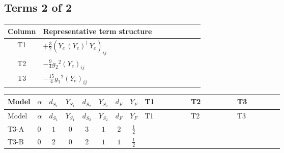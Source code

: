 \documentclass[8pt]{article}
\begin{document}
\begin{landscape}
\subsection*{Terms 2 of 2}
\begin{center}
\begin{tabular}{@{}c >{\raggedright\arraybackslash}p{0.82\linewidth}@{}}
\toprule
Column & Representative term structure \\
\midrule
T1 & \(\displaystyle +\frac{3}{2} \left({Y_e}\,\left({Y_e}\right)^{\dagger}\,{Y_e}\right)_{ij}\) \\
\midrule
T2 & \(\displaystyle -\frac{9}{4} {g_2}^2 \left({Y_e}\right)_{ij}\) \\
\midrule
T3 & \(\displaystyle -\frac{15}{4} {g_1}^2 \left({Y_e}\right)_{ij}\) \\
\midrule
\bottomrule
\end{tabular}
\end{center}
\smallskip
\tiny
\begin{longtable}{@{}llcccccc >{\raggedright\arraybackslash}p{0.21\linewidth} >{\raggedright\arraybackslash}p{0.21\linewidth} >{\raggedright\arraybackslash}p{0.21\linewidth}@{}}
\toprule
Model & $\alpha$ & $d_{S_1}$ & $Y_{S_1}$ & $d_{S_2}$ & $Y_{S_2}$ & $d_F$ & $Y_F$ & T1 & T2 & T3 \\
\midrule
\endfirsthead
\toprule
Model & $\alpha$ & $d_{S_1}$ & $Y_{S_1}$ & $d_{S_2}$ & $Y_{S_2}$ & $d_F$ & $Y_F$ & T1 & T2 & T3 \\
\midrule
\endhead
T3-A & $0$ & $1$ & $0$ & $3$ & $1$ & $2$ & $\frac{1}{2}$ & \scriptsize\adjustbox{max width=\linewidth}{$\begin{gathered} +\frac{3}{2} \left({Y_e}\,\left({Y_e}\right)^{\dagger}\,{Y_e}\right)_{ij}\end{gathered}$} & \scriptsize\adjustbox{max width=\linewidth}{$\begin{gathered} -\frac{9}{4} {g_2}^2 \left({Y_e}\right)_{ij}\end{gathered}$} & \scriptsize\adjustbox{max width=\linewidth}{$\begin{gathered} -\frac{15}{4} {g_1}^2 \left({Y_e}\right)_{ij}\end{gathered}$} \\
\midrule
T3-B & $0$ & $2$ & $0$ & $2$ & $1$ & $1$ & $\frac{1}{2}$ & \scriptsize\adjustbox{max width=\linewidth}{$\begin{gathered} +\frac{3}{2} \left({Y_e}\,\left({Y_e}\right)^{\dagger}\,{Y_e}\right)_{ij}\end{gathered}$} & \scriptsize\adjustbox{max width=\linewidth}{$\begin{gathered} -\frac{9}{4} {g_2}^2 \left({Y_e}\right)_{ij}\end{gathered}$} & \scriptsize\adjustbox{max width=\linewidth}{$\begin{gathered} -\frac{15}{4} {g_1}^2 \left({Y_e}\right)_{ij}\end{gathered}$} \\

\end{longtable}
\end{landscape}
\end{document}
